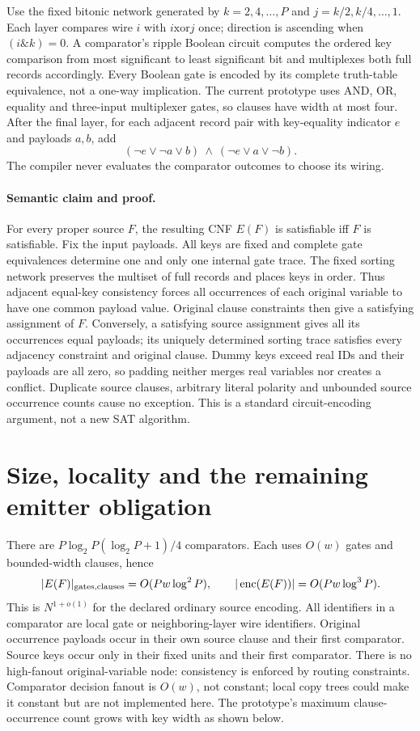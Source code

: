 \documentclass[11pt]{article}
\begin{document}
Use the fixed bitonic network generated by
$k=2,4,\ldots,P$ and $j=k/2,k/4,\ldots,1$.
Each layer compares wire $i$ with $i\mathbin{\mathrm{xor}}j$ once;
direction is ascending when $(i\mathbin{\&}k)=0$.
A comparator's ripple Boolean circuit computes the ordered key comparison
from most significant to least significant bit and multiplexes both full
records accordingly. Every Boolean gate is encoded by its complete
truth-table equivalence, not a one-way implication.
The current prototype uses AND, OR, equality and three-input multiplexer
gates, so clauses have width at most four.
After the final layer, for each adjacent record pair with key-equality
indicator $e$ and payloads $a,b$, add
\[
 (\neg e\vee\neg a\vee b)\ \land\
 (\neg e\vee a\vee\neg b).
\]
The compiler never evaluates the comparator outcomes to choose its wiring.

\paragraph{Semantic claim and proof.}
For every proper source $F$, the resulting CNF $E(F)$ is satisfiable iff
$F$ is satisfiable. Fix the input payloads. All keys are fixed and complete
gate equivalences determine one and only one internal gate trace.
The fixed sorting network preserves the multiset of full records and places
keys in order. Thus adjacent equal-key consistency forces all occurrences
of each original variable to have one common payload value. Original
clause constraints then give a satisfying assignment of $F$.
Conversely, a satisfying source assignment gives all its occurrences equal
payloads; its uniquely determined sorting trace satisfies every adjacency
constraint and original clause. Dummy keys exceed real IDs and their
payloads are all zero, so padding neither merges real variables nor creates
a conflict. Duplicate source clauses, arbitrary literal polarity and
unbounded source occurrence counts cause no exception.
This is a standard circuit-encoding argument, not a new SAT algorithm.

\section{Size, locality and the remaining emitter obligation}
There are $P\log_2P(\log_2P+1)/4$ comparators.
Each uses $O(w)$ gates and bounded-width clauses, hence
\[
 |E(F)|_{\rm gates,clauses}=O(Pw\log^2P),\qquad
 |\operatorname{enc}(E(F))|=O(Pw\log^3P).
\]
This is $N^{1+o(1)}$ for the declared ordinary source encoding.
All identifiers in a comparator are local gate or neighboring-layer wire
identifiers. Original occurrence payloads occur in their own source clause
and their first comparator. Source keys occur only in their fixed units
and their first comparator. There is no high-fanout original-variable node:
consistency is enforced by routing constraints.
Comparator decision fanout is $O(w)$, not constant; local copy trees could
make it constant but are not implemented here. The prototype's maximum
clause-occurrence count grows with key width as shown below.
\end{document}
